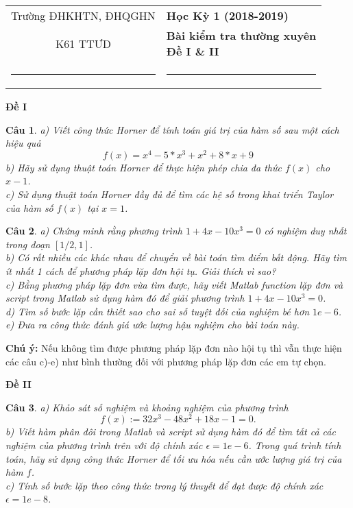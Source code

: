 \documentclass[11pt]{article}
\newtheorem{bt}{Câu}
\begin{document}
\begin{tabular*}
{\linewidth}{c>{\centering\hspace{0pt}} p{}}
Trường ĐHKHTN, ĐHQGHN & {\bf Học Kỳ 1 (2018-2019)}
\tabularnewline
K61 TTƯD & {\bf Bài kiểm tra thường xuyên \\ Đề I \& II}
\tabularnewline
\rule{1in}{1pt}  \small  & \rule{2in}{1pt} %
\tabularnewline

\end{tabular*}
%

\begin{center}	
	\textbf{Đề I}
\end{center}

\begin{bt}
	a) Viết công thức Horner để tính toán giá trị của hàm số sau một cách hiệu quả
	\[
	f(x)=x^4-5*x^3 + x^2 +8*x+9
	\]
	b) Hãy sử dụng thuật toán Horner để thực hiện phép chia đa thức $f(x)$ cho $x-1$.\\	   	
	c) Sử dụng thuật toán Horner đầy đủ để tìm các hệ số trong khai triển Taylor của hàm số $f(x)$ tại $x=1$. 
\end{bt}

\begin{bt} 
a)	Chứng minh rằng phương trình $1+4x-10x^3=0$ có nghiệm duy nhất trong đoạn $[1/2, 1]$. \\
b)	Có rất nhiều các khác nhau để chuyển về bài toán tìm điểm bất động. Hãy tìm ít nhất 1 cách để phương pháp lặp đơn hội tụ. Giải thích vì sao? \\ 
c)  Bằng phương pháp lặp đơn vừa tìm được, hãy viết Matlab function lặp đơn và script trong Matlab sử dụng hàm đó để giải phương trình $1+4x-10x^3 = 0$.\\
d)  Tìm số bước lặp cần thiết sao cho sai số tuyệt đối của nghiệm bé hơn $1e-6$. \\
e)  Đưa ra công thức đánh giá ước lượng hậu nghiệm cho bài toán này. 
\end{bt}

\textbf{Chú ý:} Nếu không tìm được phương pháp lặp đơn nào hội tụ thì vẫn thực hiện các câu c)-e) như bình thường đối với phương pháp lặp đơn các em tự chọn. 
\begin{center}	
	\textbf{Đề II}
\end{center}

\begin{bt}
	a) Khảo sát số nghiệm và khoảng nghiệm của phương trình 
	\[ f(x) := 32x^3 - 48x^2 +18x - 1 = 0.  \] 
	b) Viết hàm phân đôi trong Matlab và script sử dụng hàm đó để tìm tất cả các nghiệm của phương trình trên với độ chính xác $\epsilon=1e-6$.	
	Trong quá trình tính toán, hãy sử dụng công thức Horner để tối ưu hóa nếu cần ước lượng giá trị của hàm $f$.\\
	c) Tính số bước lặp theo công thức trong lý thuyết để đạt được độ chính xác $\epsilon=1e-8$.
\end{bt}
\end{document}
